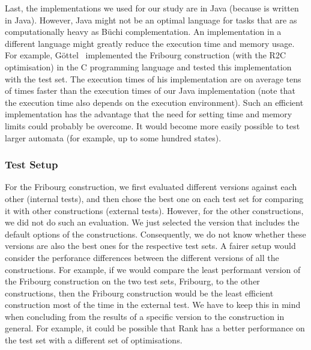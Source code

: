 Last, the implementations we used for our study are in Java (because \goal{} is written in Java). However, Java might not be an optimal language for tasks that are as computationally heavy as Büchi complementation. An implementation in a different language might greatly reduce the execution time and memory usage. For example, Göttel~\cite{2013_bsc_goettel} implemented the Fribourg construction (with the R2C optimisation) in the C programming language and tested this implementation with the \goal{} test set. The execution times of his implementation are on average tens of times faster than the execution times of our Java implementation (note that the execution time also depends on the execution environment). Such an efficient implementation has the advantage that the need for setting time and memory limits could probably be overcome. It would become more easily possible to test larger automata (for example, up to some hundred states).

\subsubsection{Test Setup}
For the Fribourg construction, we first evaluated different versions against each other (internal tests), and then chose the best one on each test set for comparing it with other constructions (external tests). However, for the other constructions, we did not do such an evaluation. We just selected the version that includes the default options of the constructions. Consequently, we do not know whether these versions are also the best ones for the respective test sets. A fairer setup would consider the perforance differences between the different versions of all the constructions. For example, if we would compare the least performant version of the Fribourg construction on the two test sets, Fribourg, to the other constructions, then the Fribourg construction would be the least efficient construction most of the time in the external test. We have to keep this in mind when concluding from the results of a specific version to the construction in general. For example, it could be possible that Rank has a better performance on the \goal{} test set with a different set of optimisations.

